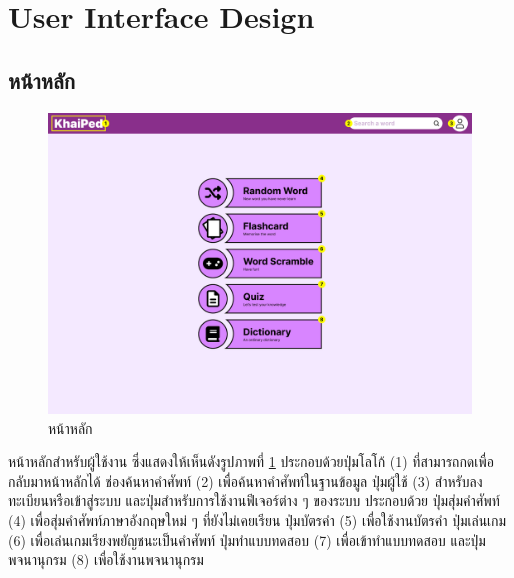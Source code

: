 \documentclass[12pt,oneside,openright,a4paper]{cpe-thai-project}
\begin{document}
\pagebreak
\section{User Interface Design}
\subsection{หน้าหลัก}
\begin{figure}[!h]\centering
	\includegraphics[width=\textwidth, keepaspectratio=true]{image/chap3/ui/Home page.png}
	\caption{หน้าหลัก}\label{fig:UI_Home}
\end{figure}
\hspace{1cm}
หน้าหลักสำหรับผู้ใช้งาน ซึ่งแสดงให้เห็นดังรูปภาพที่ \ref{fig:UI_Home} ประกอบด้วยปุ่มโลโก้ (1) ที่สามารถกดเพื่อกลับมาหน้าหลักได้ ช่องค้นหาคำศัพท์ (2) เพื่อค้นหาคำศัพท์ในฐานข้อมูล
ปุ่มผู้ใช้ (3) สำหรับลงทะเบียนหรือเข้าสู่ระบบ และปุ่มสำหรับการใช้งานฟีเจอร์ต่าง ๆ ของระบบ ประกอบด้วย
ปุ่มสุ่มคำศัพท์ (4) เพื่อสุ่มคำศัพท์ภาษาอังกฤษใหม่ ๆ ที่ยังไม่เคยเรียน ปุ่มบัตรคำ (5) เพื่อใช้งานบัตรคำ ปุ่มเล่นเกม (6) เพื่อเล่นเกมเรียงพยัญชนะเป็นคำศัพท์
ปุ่มทำแบบทดสอบ (7) เพื่อเข้าทำแบบทดสอบ และปุ่มพจนานุกรม (8) เพื่อใช้งานพจนานุกรม

\pagebreak
\end{document}
